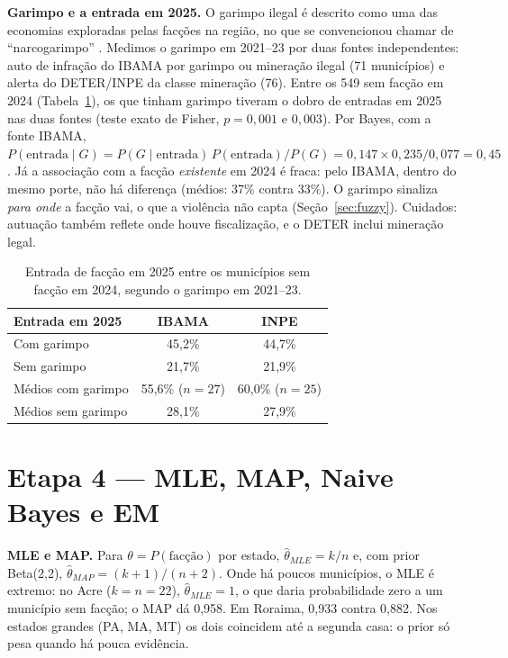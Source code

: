 \documentclass[10pt,a4paper,twocolumn]{article}
\begin{document}
\textbf{Garimpo e a entrada em 2025.} O garimpo ilegal é descrito como uma das economias
exploradas pelas facções na região, no que se convencionou chamar de ``narcogarimpo''
\cite{chagas2024,pereirachagas}. Medimos o garimpo em 2021--23 por duas fontes independentes:
auto de infração do IBAMA por garimpo ou mineração ilegal (71 municípios) e alerta do DETER/INPE
da classe mineração (76). Entre os 549 sem facção em 2024 (Tabela~\ref{tab:garimpo}), os que tinham
garimpo tiveram o dobro de entradas em 2025 nas duas fontes (teste exato de Fisher, $p=0{,}001$ e
$0{,}003$). Por Bayes, com a fonte IBAMA,
$P(\text{entrada}\mid G)=P(G\mid\text{entrada})\,P(\text{entrada})/P(G)=0{,}147\times0{,}235/0{,}077=0{,}45$.
Já a associação com a facção \emph{existente} em 2024 é fraca: pelo IBAMA, dentro do mesmo porte,
não há diferença (médios: 37\% contra 33\%). O garimpo sinaliza \emph{para onde} a facção vai, o que a
violência não capta (Seção~\ref{sec:fuzzy}). Cuidados: autuação também reflete onde houve
fiscalização, e o DETER inclui mineração legal.

\begin{table}[H]\centering\small
\begin{tabular}{lcc}\toprule
Entrada em 2025 & IBAMA & INPE\\\midrule
Com garimpo & 45,2\% & 44,7\%\\
Sem garimpo & 21,7\% & 21,9\%\\
Médios com garimpo & 55,6\% ($n=27$) & 60,0\% ($n=25$)\\
Médios sem garimpo & 28,1\% & 27,9\%\\\bottomrule
\end{tabular}\caption{Entrada de facção em 2025 entre os municípios sem facção em 2024, segundo o garimpo em 2021--23.}\label{tab:garimpo}\end{table}

\section{Etapa 4 --- MLE, MAP, Naive Bayes e EM}
\textbf{MLE e MAP.} Para $\theta=P(\text{facção})$ por estado, $\hat\theta_{MLE}=k/n$ e, com prior
Beta(2,2), $\hat\theta_{MAP}=(k+1)/(n+2)$. Onde há poucos municípios, o MLE é extremo: no Acre
($k=n=22$), $\hat\theta_{MLE}=1$, o que daria probabilidade zero a um município sem facção; o MAP
dá 0,958. Em Roraima, 0,933 contra 0,882. Nos estados grandes (PA, MA, MT) os dois coincidem até a
segunda casa: o prior só pesa quando há pouca evidência.
\end{document}
